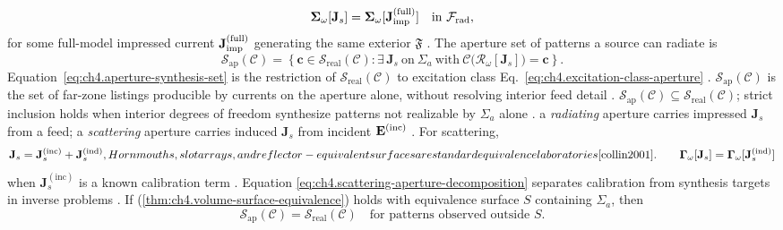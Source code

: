 \begin{equation}
\label{eq:ch4.aperture-equivalent-def}
\boldsymbol{\Sigma}_\omega[\mathbf{J}_{s}]
=
\boldsymbol{\Sigma}_\omega[\mathbf{J}_{\mathrm{imp}}^{\mathrm{(full)}}]
\quad\text{in}\ \mathcal{F}_{\mathrm{rad}},
\end{equation}
for some full-model impressed current \(\mathbf{J}_{\mathrm{imp}}^{\mathrm{(full)}}\) generating the same exterior
\(\mathfrak{F}\) \cite{stratton1941}. The aperture set of patterns a source can radiate is
\begin{equation}
\label{eq:ch4.aperture-synthesis-set}
\mathcal{S}_{\mathrm{ap}}(\mathcal{C})
=
\left\{
\mathbf{c}\in\mathcal{S}_{\mathrm{real}}(\mathcal{C}):
\exists\,\mathbf{J}_{s}\ \text{on}\ \Sigma_{a}\ \text{with}\
\mathcal{C}\big(\mathcal{R}_\omega[\mathbf{J}_{s}]\big)=\mathbf{c}
\right\}.
\end{equation}
Equation~\eqref{eq:ch4.aperture-synthesis-set} is the restriction of
\(\mathcal{S}_{\mathrm{real}}(\mathcal{C})\) to excitation class
Eq.~\eqref{eq:ch4.excitation-class-aperture} \cite{harrington2001}. \(\mathcal{S}_{\mathrm{ap}}(\mathcal{C})\)
is the set of far-zone listings producible by currents on the aperture alone, without resolving interior feed
detail \cite{collin2001}. \(\mathcal{S}_{\mathrm{ap}}(\mathcal{C})\subseteq\mathcal{S}_{\mathrm{real}}(\mathcal{C})\);
strict inclusion holds when interior degrees of freedom synthesize patterns not realizable by \(\Sigma_{a}\) alone
\cite{stratton1941}.
a \emph{radiating} aperture carries impressed \(\mathbf{J}_{s}\) from a feed; a \emph{scattering} aperture
carries induced \(\mathbf{J}_{s}\) from incident \(\mathbf{E}^{\mathrm{(inc)}}\) \cite{stratton1941}. For scattering,
\begin{equation}
\label{eq:ch4.scattering-aperture-decomposition}
\mathbf{J}_{s}
=
\mathbf{J}_{s}^{\mathrm{(inc)}}+\mathbf{J}_{s}^{\mathrm{(ind)}},
Horn mouths, slot arrays, and reflector-equivalent surfaces are standard equivalence laboratories \cite{collin2001}.
\qquad
\boldsymbol{\Gamma}_\omega[\mathbf{J}_{s}]
=
\boldsymbol{\Gamma}_\omega[\mathbf{J}_{s}^{\mathrm{(ind)}}]
\end{equation}
when \(\mathbf{J}_{s}^{\mathrm{(inc)}}\) is a known calibration term \cite{stratton1941}. Equation
\eqref{eq:ch4.scattering-aperture-decomposition} separates calibration from synthesis targets in inverse
problems \cite{devaney2004}.
\label{prop:ch4.aperture-realizability-reduction}
If (\ref{thm:ch4.volume-surface-equivalence}) holds with equivalence surface \(S\) containing
\(\Sigma_{a}\), then
\begin{equation}
\label{eq:ch4.aperture-containment}
\mathcal{S}_{\mathrm{ap}}(\mathcal{C})
=
\mathcal{S}_{\mathrm{real}}(\mathcal{C})
\quad\text{for patterns observed outside }S.
\end{equation}
